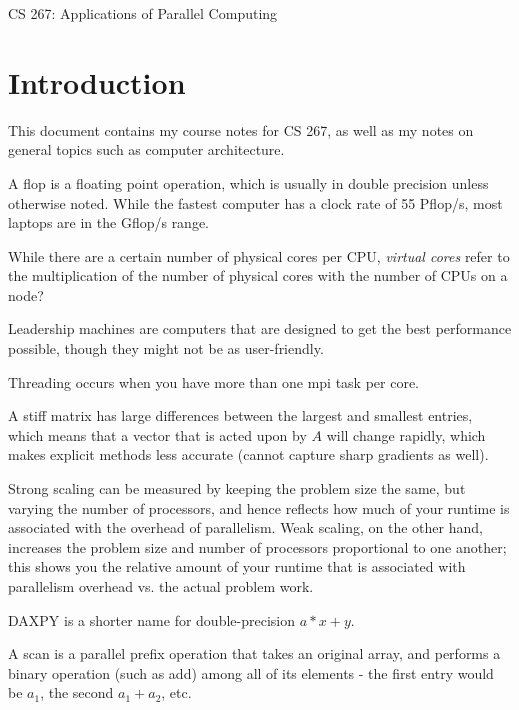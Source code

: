 \documentclass[10pt]{article}
\begin{document}
\begin{centering}
\Large CS 267: Applications of Parallel Computing\\
\end{centering}

\tableofcontents
\clearpage

\section{Introduction}
\begin{flushleft}\justify

This document contains my course notes for CS 267, as well as my notes on general topics such as computer architecture.

A flop is a floating point operation, which is usually in double precision unless otherwise noted. While the fastest computer has a clock rate of 55 Pflop/s, most laptops are in the Gflop/s range. 

While there are a certain number of physical cores per CPU, \textit{virtual cores} refer to the multiplication of the number of physical cores with the number of CPUs on a node? 

Leadership machines are computers that are designed to get the best performance possible, though they might not be as user-friendly.

Threading occurs when you have more than one \gls{mpi} task per core. 

A stiff matrix has large differences between the largest and smallest entries, which means that a vector that is acted upon by \(A\) will change rapidly, which makes explicit methods less accurate (cannot capture sharp gradients as well). 

Strong scaling can be measured by keeping the problem size the same, but varying the number of processors, and hence reflects how much of your runtime is associated with the overhead of parallelism. Weak scaling, on the other hand, increases the problem size and number of processors proportional to one another; this shows you the relative amount of your runtime that is associated with parallelism overhead vs. the actual problem work.

DAXPY is a shorter name for double-precision \(a*x+y\). 

A scan is a parallel prefix operation that takes an original array, and performs a binary operation (such as add) among all of its elements - the first entry would be \(a_1\), the second \(a_1+a_2\), etc. 


\end{flushleft}
\end{document}
